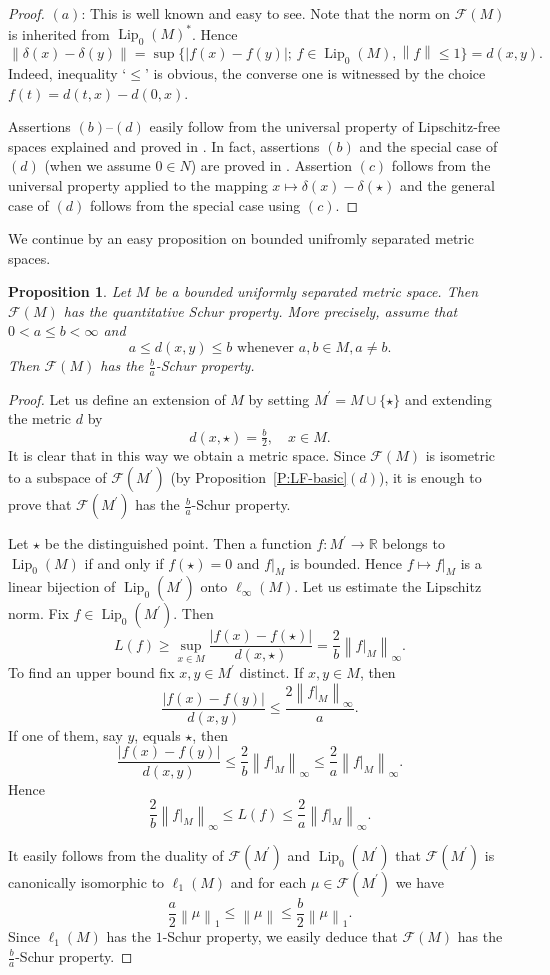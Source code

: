 \documentclass{amsart}
\numberwithin{equation}{section}
\newtheorem{prop}[thm]{Proposition}
\theoremstyle{definition}
\def\F{\mathcal F}
\def\er{\mathbb R}
\def \Lip {\operatorname{Lip}}
\newcommand{\norm}[1]{\left\|#1\right\|}
\newcommand{\abs}[1]{\left|#1\right|}
\newcommand{\setsep}{;\,}
\begin{document}
\begin{proof}
    $(a)$: This is well known and easy to see. Note that the norm on $\F(M)$ is inherited from $\Lip_0(M)^*$. Hence 
    $$\norm{\delta(x)-\delta(y)}=\sup\{\abs{f(x)-f(y)}\setsep f\in\Lip_0(M),\norm{f}\le 1\}=d(x,y).$$
    Indeed, inequality `$\le$' is obvious, the converse one is witnessed by the choice $f(t)=d(t,x)-d(0,x)$.

    Assertions $(b)$--$(d)$ easily follow from the universal property of Lipschitz-free spaces explained and proved in \cite[Section 2]{cuth-doucha-w}. In fact, assertions $(b)$ and the special case of $(d)$ (when we assume $0\in N$) are proved in \cite[Section 2]{cuth-doucha-w}. Assertion $(c)$ follows from the universal property applied to the mapping $x\mapsto \delta(x)-\delta(\star)$ and the general case of $(d)$ follows from the special case using $(c)$.
\end{proof}

We continue by an easy proposition on bounded unifromly separated metric spaces.

\begin{prop}\label{P:discrete-ab}
    Let $M$ be a bounded uniformly separated metric space. Then $\F(M)$ has the quantitative Schur property. 
    More precisely, assume that $0<a\le b<\infty$ and
    $$a\le d(x,y)\le b\mbox{ whenever }a,b\in M, a\ne b.$$
    Then $\F(M)$ has the $\frac ba$-Schur property.
\end{prop}

\begin{proof} Let us define an extension of $M$ by setting $M^\prime=M\cup\{\star\}$ and extending the metric $d$ by
    $$d(x,\star)=\tfrac b2, \quad x\in M.$$
    It is clear that in this way we obtain a metric space. Since $\F(M)$ is isometric to a subspace of 
    $\F(M^\prime)$ (by Proposition~\ref{P:LF-basic}$(d)$), it is enough to prove that $\F(M^\prime)$ has the $\frac ba$-Schur property.

    Let $\star$ be the distinguished point. Then
    a function $f:M^\prime\to\er$ belongs to $\Lip_0(M)$ if and only if $f(\star)=0$ and $f|_M$ is bounded. Hence
    $f\mapsto f|_M$ is a linear bijection of $\Lip_0(M^\prime)$ onto $\ell_\infty(M)$. Let us estimate the Lipschitz norm. Fix $f\in \Lip_0(M^\prime)$. Then
    $$L(f)\ge\sup_{x\in M} \frac{\abs{f(x)-f(\star)}}{d(x,\star)}=\frac 2b\norm{f|_M}_\infty.$$
    To find an upper bound fix $x,y\in M^\prime$ distinct. If $x,y\in M$, then
    $$\frac{\abs{f(x)-f(y)}}{d(x,y)}\le \frac{2\norm{f|_M}_\infty}{a}.$$
    If one of them, say $y$, equals $\star$, then
    $$\frac{\abs{f(x)-f(y)}}{d(x,y)}\le \frac2b \norm{f|_M}_\infty\le \frac2a \norm{f|_M}_\infty.$$
    Hence
    $$\frac2b\norm{f|_M}_\infty\le L(f)\le \frac2a\norm{f|_M}_\infty.$$

    It easily follows from the duality of $\F(M^\prime)$ and $\Lip_0(M^\prime)$ that $\F(M^\prime)$ is canonically isomorphic to $\ell_1(M)$ and for each $\mu\in \F(M^\prime)$ we have
    $$\frac a2\norm{\mu}_1\le \norm{\mu}\le \frac b2\norm{\mu}_1.$$
    Since $\ell_1(M)$ has the $1$-Schur property, we easily deduce that $\F(M)$ has the $\frac ba$-Schur property.
\end{proof}
\end{document}
